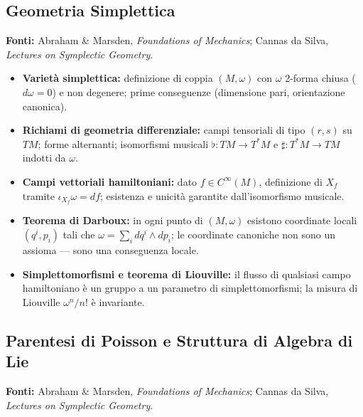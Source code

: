 \documentclass[12pt, a4paper]{article}
\newcommand{\fonti}[1]{%
	\begin{fontebox}
		\textcolor{fontecolor}{\footnotesize\textbf{Fonti:} #1}
	\end{fontebox}%
}
\begin{document}
	\subsection{Geometria Simplettica}
	
	\fonti{Abraham \& Marsden, \textit{Foundations of Mechanics}; Cannas da Silva,
		\textit{Lectures on Symplectic Geometry}.}
	
	\begin{itemize}
		\item \textbf{Varietà simplettica:} definizione di coppia $(M, \omega)$ con $\omega$
		2-forma chiusa ($d\omega = 0$) e non degenere; prime conseguenze (dimensione
		pari, orientazione canonica).
		\item \textbf{Richiami di geometria differenziale:} campi tensoriali di tipo $(r,s)$
		su $TM$; forme alternanti; isomorfismi musicali $\flat: TM \to T^*M$ e
		$\sharp: T^*M \to TM$ indotti da $\omega$.
		\item \textbf{Campi vettoriali hamiltoniani:} dato $f \in C^\infty(M)$, definizione
		di $X_f$ tramite $\iota_{X_f}\omega = df$; esistenza e unicità garantite dall'isomorfismo
		musicale.
		\item \textbf{Teorema di Darboux:} in ogni punto di $(M, \omega)$ esistono coordinate
		locali $(q^i, p_i)$ tali che $\omega = \sum_i dq^i \wedge dp_i$; le coordinate
		canoniche non sono un assioma --- sono una conseguenza locale.
		\item \textbf{Simplettomorfismi e teorema di Liouville:} il flusso di qualsiasi campo
		hamiltoniano è un gruppo a un parametro di simplettomorfismi; la misura di Liouville
		$\omega^n/n!$ è invariante.
	\end{itemize}
	
	\subsection{Parentesi di Poisson e Struttura di Algebra di Lie}
	
	\fonti{Abraham \& Marsden, \textit{Foundations of Mechanics}; Cannas da Silva,
		\textit{Lectures on Symplectic Geometry}.}
	
\end{document}
